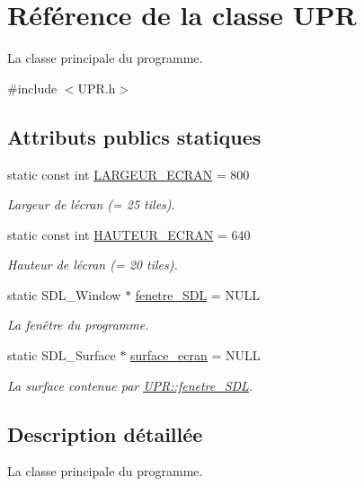 \hypertarget{class_u_p_r}{}\section{Référence de la classe U\+P\+R}
\label{class_u_p_r}


La classe principale du programme.  




{\ttfamily \#include $<$U\+P\+R.\+h$>$}

\subsection*{Attributs publics statiques}
\begin{DoxyCompactItemize}
\item 
static const int \hyperlink{class_u_p_r_a29b280f8a41e96854465f42ce303520b}{L\+A\+R\+G\+E\+U\+R\+\_\+\+E\+C\+R\+A\+N} = 800
\begin{DoxyCompactList}\small\item\em Largeur de l\textquotesingle{}écran (= 25 tiles). \end{DoxyCompactList}\item 
static const int \hyperlink{class_u_p_r_a68b3cf191ad71e0bea073c214f47b760}{H\+A\+U\+T\+E\+U\+R\+\_\+\+E\+C\+R\+A\+N} = 640
\begin{DoxyCompactList}\small\item\em Hauteur de l\textquotesingle{}écran (= 20 tiles). \end{DoxyCompactList}\item 
static S\+D\+L\+\_\+\+Window $\ast$ \hyperlink{class_u_p_r_a337a823f61ad23359193a2d031d3376e}{fenetre\+\_\+\+S\+D\+L} = N\+U\+L\+L
\begin{DoxyCompactList}\small\item\em La fenêtre du programme. \end{DoxyCompactList}\item 
static S\+D\+L\+\_\+\+Surface $\ast$ \hyperlink{class_u_p_r_af6f9d806062f3d722ac9e16ac6946814}{surface\+\_\+ecran} = N\+U\+L\+L
\begin{DoxyCompactList}\small\item\em La surface contenue par \hyperlink{class_u_p_r_a337a823f61ad23359193a2d031d3376e}{U\+P\+R\+::fenetre\+\_\+\+S\+D\+L}. \end{DoxyCompactList}\end{DoxyCompactItemize}


\subsection{Description détaillée}
La classe principale du programme. 

